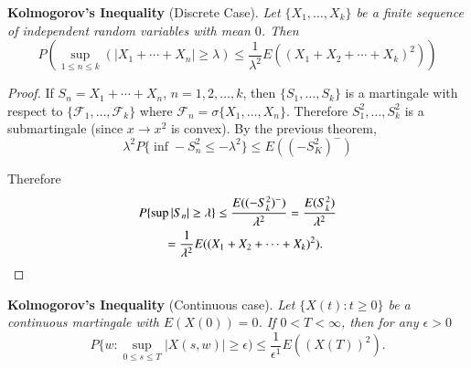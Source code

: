 \noindent
{\bf Kolmogorov's Inequality} (Discrete Case). {\em Let\pageoriginale
$\{X_{1},\ldots,X_{k}\}$ be a finite sequence of independent random
  variables with mean $0$. Then}
$$
P\left(\sup\limits_{1\leq n\leq k}(|X_{1}+\cdots+X_{n}|\geq
\lambda)\leq \frac{1}{\lambda^{2}}E((X_{1}+X_{2}+\cdots+X_{k})^{2})\right)
$$

\begin{proof}
If $S_{n}=X_{1}+\cdots+X_{n}$, $n=1,2,\ldots,k$, then
$\{S_{1},\ldots,S_{k}\}$ is a martingale with respect to
$\{\mathscr{F}_{1},\ldots,\mathscr{F}_{k}\}$ where
$\mathscr{F}_{n}=\sigma\{X_{1},\ldots,X_{n}\}$. Therefore
$S^{2}_{1},\ldots,S^{2}_{k}$ is a submartingale (since $x\to x^{2}$ is
convex). By the previous theorem,
$$
\lambda^{2}P\{\inf -S^{2}_{n}\leq -\lambda^{2}\}\leq
E((-S^{2}_{K})^{-})
$$

Therefore
\begin{align*}
& P\{\sup |S_{n}|\geq \lambda\} \leq
  \frac{E((-S^{2}_{k})^{-})}{\lambda^{2}}=\frac{E(S^{2}_{k})}{\lambda^{2}}\\
&\qquad =\frac{1}{\lambda^{2}}E((X_{1}+X_{2}+\cdots+X_{k})^{2}).
\end{align*}
\end{proof}

\noindent
{\bf Kolmogorov's Inequality} (Continuous case). {\em Let $\{X(t):t\geq
0\}$ be a continuous martingale with $E(X(0))=0$. If $0<T<\infty$,
then for any $\epsilon>0$}
$$
P\Big\{w:\sup\limits_{0\leq s\leq T}|X(s,w)|\geq \epsilon\Big)\leq
\frac{1}{\epsilon^{1}}E((X(T))^{2}). 
$$

